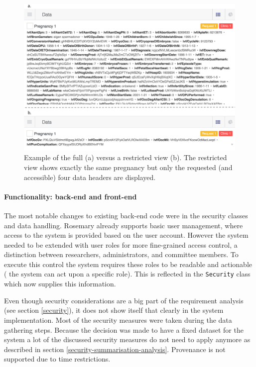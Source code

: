 \begin{figure}[ht]
	\centering
	\includegraphics[width=0.9\linewidth]{images/datasets-example-edit}
	\caption{
		Example of the full \projectdata{} (a) versus a restricted view (b).
		The restricted view shows exactly the same pregnancy but only the requested (and accessible) four data headers are displayed.
	}
	\label{fig:dataset-example}
\end{figure}

\paragraph{Functionality: back-end and front-end}
The most notable changes to existing back-end code were in the security classes and data handling.
Rosemary already supports basic user management, where access to the system is provided based on the user account.
However the system needed to be extended with user roles for more fine-grained access control, \ie{} a distinction between researchers, administrators, and committee members.
To execute this control the system requires these roles to be readable and actionable (\ie{} the system can act upon a specific role).
This is reflected in the {\tt Security} class which now supplies this information.

Even though security considerations are a big part of the requirement analysis (see section \ref{security}), it does not show itself that clearly in the system implementation.
Most of the security measures were taken during the data gathering steps.
Because the decision was made to have a fixed dataset for the system a lot of the discussed security measures do not need to apply anymore as described in section \ref{security-summarisation-analysis}.
Provenance is not supported due to time restrictions.

